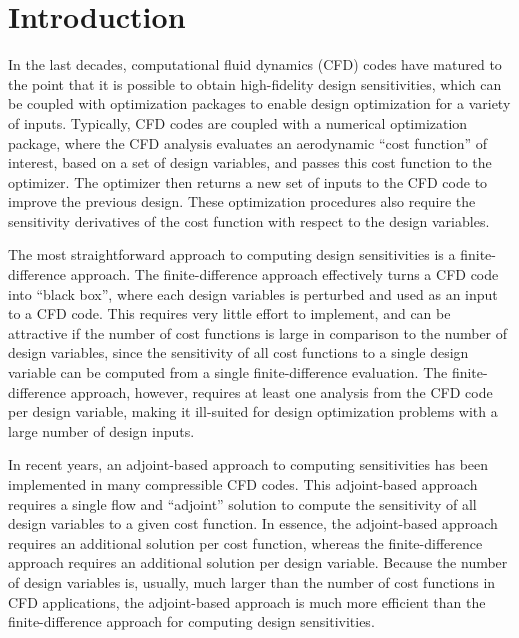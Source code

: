 \chapter{Introduction}
\label{chapter-one}

In the last decades, computational fluid dynamics (CFD) codes have matured to
the point that it is possible to obtain high-fidelity design sensitivities,
which can be coupled with optimization packages to enable design optimization
for a variety of inputs\cite{baysal1992aerodynamic, balagangadhar2001design}.
Typically, CFD codes are coupled with a numerical optimization
package\cite{SNOPT-alg, KSOPT, fletcher1963rapidly, npsol-manual}, where the CFD
analysis evaluates an aerodynamic ``cost function'' of interest, based on a set
of design variables, and passes this cost function to the optimizer.  The
optimizer then returns a new set of inputs to the CFD code to improve the
previous design.  These optimization procedures also require the sensitivity
derivatives of the cost function with respect to the design variables.  

The most straightforward approach to computing design sensitivities is a
finite-difference approach.  The finite-difference approach effectively turns a
CFD code into ``black box'', where each design variables is perturbed and used
as an input to a CFD code.  This requires very little effort to implement, and
can be attractive if the number of cost functions is large in comparison to the
number of design variables, since the sensitivity of all cost functions to a
single design variable can be computed from a single finite-difference
evaluation.  The finite-difference approach, however, requires at least one
analysis from the CFD code per design variable, making it ill-suited for design
optimization problems with a large number of design inputs.

In recent years, an adjoint-based approach to computing sensitivities has been
implemented in many compressible CFD codes\cite{mavriplis-2006,
nemec-aftosmis-adjoint, nielsen2002recent, reuther1999constrained}. This
adjoint-based approach requires a single flow and ``adjoint'' solution to
compute the sensitivity of all design variables to a given cost function.
In essence, the adjoint-based approach requires an additional solution per cost
function, whereas the finite-difference approach requires an additional solution
per design variable.  Because the number of design variables is, usually, much
larger than the number of cost functions in CFD applications, the adjoint-based
approach is much more efficient than the finite-difference approach for
computing design sensitivities.


